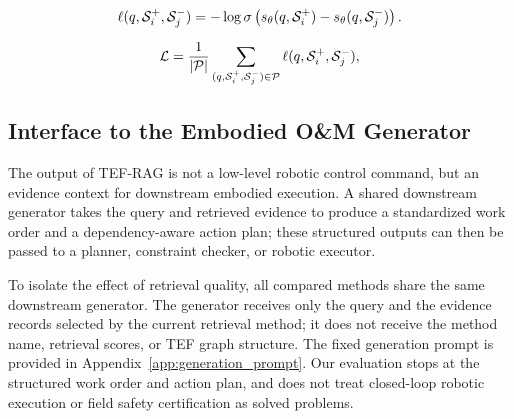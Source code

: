 \begin{equation}
\ell(q,\mathcal{S}_i^+,\mathcal{S}_j^-)
=
-\log \sigma\left(
s_{\theta}(q,\mathcal{S}_i^+)
-
s_{\theta}(q,\mathcal{S}_j^-)
\right).
\label{eq:ranknet_pair_loss}
\end{equation}

\begin{equation}
\mathcal{L}
=
\frac{1}{|\mathcal{P}|}
\sum_{(q,\mathcal{S}_i^+,\mathcal{S}_j^-)\in\mathcal{P}}
\ell(q,\mathcal{S}_i^+,\mathcal{S}_j^-),
\label{eq:ranknet_loss}
\end{equation}



\subsection{Interface to the Embodied O\&M Generator}

The output of TEF-RAG is not a low-level robotic control command, but an evidence context for downstream embodied execution. A shared downstream generator takes the query and retrieved evidence to produce a standardized work order and a dependency-aware action plan; these structured outputs can then be passed to a planner, constraint checker, or robotic executor.

To isolate the effect of retrieval quality, all compared methods share the same downstream generator. The generator receives only the query and the evidence records selected by the current retrieval method; it does not receive the method name, retrieval scores, or TEF graph structure. The fixed generation prompt is provided in Appendix~\ref{app:generation_prompt}. Our evaluation stops at the structured work order and action plan, and does not treat closed-loop robotic execution or field safety certification as solved problems.